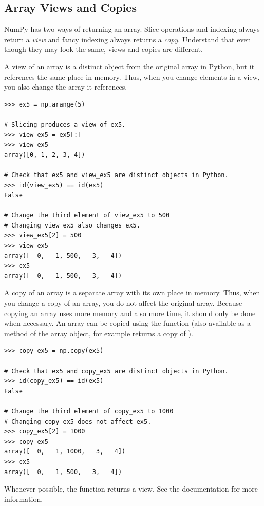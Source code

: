 \subsection*{Array Views and Copies} 
NumPy has two ways of returning an array. Slice operations and indexing always return
a \emph{view} and fancy indexing always returns a \emph{copy}.
Understand that even though they may look the same, views and copies are different.


A view of an array is a distinct object from the original array in Python, but it references the same place in memory. 
Thus, when you change elements in a view, you also change the array it references.
\begin{lstlisting}
>>> ex5 = np.arange(5)

# Slicing produces a view of ex5. 
>>> view_ex5 = ex5[:]
>>> view_ex5
array([0, 1, 2, 3, 4])

# Check that ex5 and view_ex5 are distinct objects in Python.
>>> id(view_ex5) == id(ex5) 
False

# Change the third element of view_ex5 to 500
# Changing view_ex5 also changes ex5.
>>> view_ex5[2] = 500 
>>> view_ex5
array([  0,   1, 500,   3,   4])
>>> ex5 
array([  0,   1, 500,   3,   4])
\end{lstlisting} 

A copy of an array is a separate array with its own place in memory. 
Thus, when you change a copy of an array, you do not affect the original array. 
Because copying an array uses more memory and also more time, it should only be done when necessary. 
An array can be copied using the  function (also available as a method of 
the array object, for example  returns a copy of ). 

\begin{lstlisting}
>>> copy_ex5 = np.copy(ex5) 

# Check that ex5 and copy_ex5 are distinct objects in Python.
>>> id(copy_ex5) == id(ex5) 
False

# Change the third element of copy_ex5 to 1000
# Changing copy_ex5 does not affect ex5.
>>> copy_ex5[2] = 1000 
>>> copy_ex5
array([  0,   1, 1000,   3,   4])
>>> ex5
array([  0,   1, 500,   3,   4])
\end{lstlisting} 

Whenever possible, the function  returns a view. 
See the documentation for more information. 



